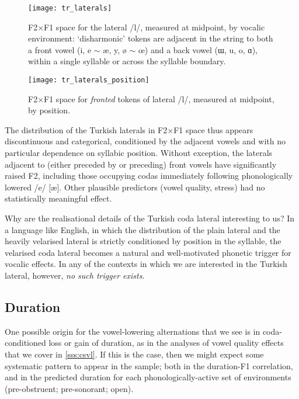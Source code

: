 \begin{figure}[H]
  \centering
  \texttt{[image: tr\_laterals]}
  \caption[F2$\times$F1 distribution for the lateral /l/ by vocalic environment.]{F2$\times$F1 space for the lateral /l/, measured at midpoint, by vocalic environment: `disharmonic' tokens are adjacent in the string to both a front vowel (i, e $\sim$ æ, y, ø $\sim$ œ) and a back vowel (ɯ, u, o, ɑ), within a single syllable or across the syllable boundary.}
  \label{fig:trlateral}
\end{figure}

\begin{figure}[H]
  \centering
  \texttt{[image: tr\_laterals\_position]}
  \caption[F2$\times$F1 distribution for fronted /l/ by syllabic position.]{F2$\times$F1 space for \textit{fronted} tokens of lateral /l/, measured at midpoint, by position.}
  \label{fig:trlateral_pos}
\end{figure}

The distribution of the Turkish laterals in F2$\times$F1 space thus appears discontinuous and categorical, conditioned by the adjacent vowels and with no particular dependence on syllabic position. Without exception, the laterals adjacent to (either preceded by or preceding) front vowels have significantly raised F2, including those occupying codas immediately following phonologically lowered /e/ [\ae]. Other plausible predictors (vowel quality, stress) had no statistically meaningful effect.

Why are the realisational details of the Turkish coda lateral interesting to us? In a language like English, in which the distribution of the plain lateral and the heavily velarised lateral is strictly conditioned by position in the syllable, the velarised coda lateral becomes a natural and well-motivated phonetic trigger for vocalic effects. In any of the contexts in which we are interested in the Turkish lateral, however, \emph{no such trigger exists}.

\subsection{Duration}\label{ss:trduration}

One possible origin for the vowel-lowering alternations that we see is in coda-conditioned loss or gain of duration, as in the analyses of vowel quality effects that we cover in \cref{sss:csvl}. If this is the case, then we might expect some systematic pattern to appear in the sample; both in the duration-F1 correlation, and in the predicted duration for each phonologically-active set of environments (pre-obstruent; pre-sonorant; open).

